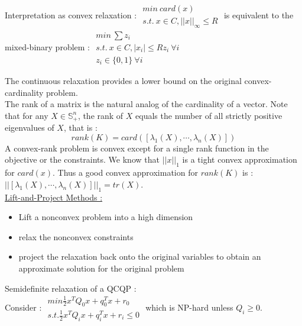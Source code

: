\documentclass[../main.tex]{subfiles}
\begin{document}
Interpretation as convex relaxation : $\begin{matrix}
    min \: card(x)\\
    s.t. \: x \in C, \lvert \lvert x\rvert \rvert_\infty \leq R
\end{matrix}$ is equivalent to the mixed-binary problem : $\begin{matrix}
    min \: \sum z_i\\
    s.t. \: x\in C, \lvert x_i\rvert \leq Rz_i \: \forall i\\
    z_i \in \{0,1\}\: \forall i
\end{matrix}$

The continuous relaxation provides a lower bound on the original convex-cardinality problem.\\

The rank of a matrix is the natural analog of the cardinality of a vector. Note that for any $X \in \mathbb{S}^n_+$, the rank of $X$ equals the number of all strictly positive eigenvalues of $X$, that is : \begin{equation}
    rank(K) = card([\lambda_1 (X), \cdots, \lambda_n(X)])
\end{equation}
A convex-rank problem is convex except for a single rank function in the objective or the constraints. We know that $\lvert\lvert x\rvert\rvert_1$ is a tight convex approximation for $card(x)$. Thus a good convex approximation for $rank(K)$ is : $\lvert\lvert [\lambda_1(X), \cdots, \lambda_n(X)] \rvert\rvert_1 = tr(X)$.\\

\quad \underline{Lift-and-Project Methods :}\\

\begin{itemize}
    \item Lift a nonconvex problem into a high dimension
    \item relax the nonconvex constraints
    \item project the relaxation back onto the original variables to obtain an approximate solution for the original problem
\end{itemize}

Semidefinite relaxation of a QCQP : \\
Consider : $\begin{matrix}
    min \frac{1}{2} x^T Q_0 x + q_0^T x + r_0\\
    s.t. \frac{1}{2} x^T Q_i x + q_i^T x + r_i \leq 0
\end{matrix}$ which is NP-hard unless $Q_i \geq 0$.\\
\end{document}
